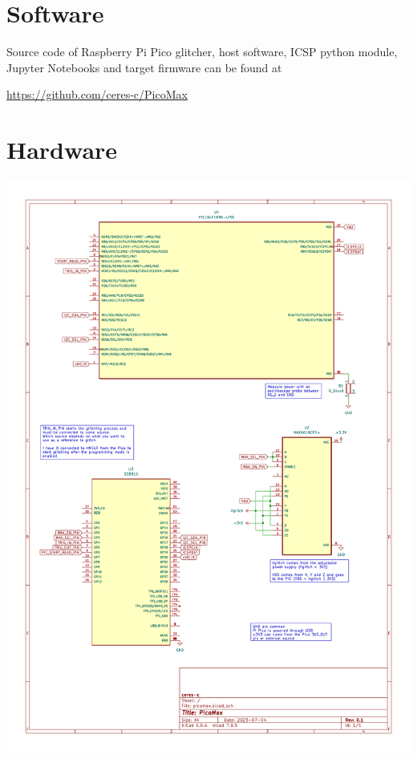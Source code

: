 \documentclass[a4paper,english,twoside,10pt]{article}
\begin{document}
\clearpage%
\printglossary[type=\acronymtype]%
\printglossary%
{
\raggedright%


}

\hfill%
\begin{appendix}
\section{Software}
Source code of Raspberry Pi Pico glitcher, host software, ICSP python module, Jupyter Notebooks and target firmware can be found at

\begin{center}
	\url{https://github.com/ceres-c/PicoMax}
\end{center}
\clearpage%
\section{Hardware}\label{app:hardware}
\begin{center}
	\includegraphics[height=.95\textheight]{../hardware/schematic.pdf}
\end{center}
\end{appendix}
\end{document}
